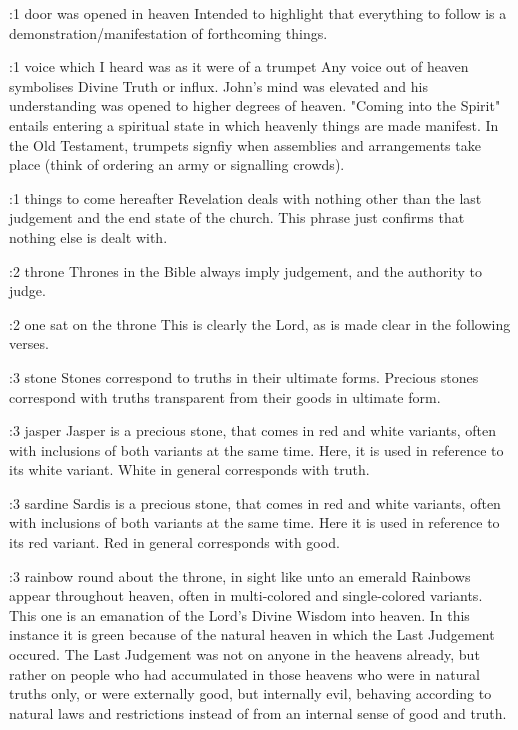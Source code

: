 %
%
%
:1 {door was opened in heaven}
Intended to highlight that everything to follow is a demonstration/manifestation of forthcoming things.

:1 {voice which I heard was as it were of a trumpet}
Any voice out of heaven symbolises Divine Truth or influx. John's mind was elevated and his understanding was opened to higher degrees of heaven. "Coming into the Spirit" entails entering a spiritual state in which heavenly things are made manifest. In the Old Testament, trumpets signfiy when assemblies and arrangements take place (think of ordering an army or signalling crowds). 

:1 {things to come hereafter}
Revelation deals with nothing other than the last judgement and the end state of the church. This phrase just confirms that nothing else is dealt with.

:2 {throne}
Thrones in the Bible always imply judgement, and the authority to judge.

:2 {one sat on the throne}
This is clearly the Lord, as is made clear in the following verses.

:3 {stone}
Stones correspond to truths in their ultimate forms. Precious stones correspond with truths transparent from their goods in ultimate form.

:3 {jasper}
Jasper is a precious stone, that comes in red and white variants, often with inclusions of both variants at the same time. Here, it is used in reference to its white variant. White in general corresponds with truth.

:3 {sardine}
Sardis is a precious stone, that comes in red and white variants, often with inclusions of both variants at the same time. Here it is used in reference to its red variant. Red in general corresponds with good.

:3 {rainbow round about the throne, in sight like unto an emerald}
Rainbows appear throughout heaven, often in multi-colored and single-colored variants. This one is an emanation of the Lord's Divine Wisdom into heaven. In this instance it is green because of the natural heaven in which the Last Judgement occured. The Last Judgement was not on anyone in the heavens already, but rather on people who had accumulated in those heavens who were in natural truths only, or were externally good, but internally evil, behaving according to natural laws and restrictions instead of from an internal sense of good and truth. 

